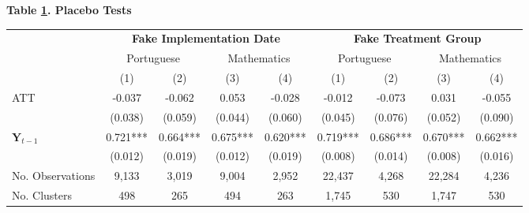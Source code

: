 \documentclass[a4paper, 12pt]{article}
\begin{document}
{
             \begin{table}[h]                                    \label{table:PlaceboTest}                        \centering            \textbf{Table \ref{table:PlaceboTest}. Placebo Tests} \\
\vspace{5pt}                    
\begin{adjustbox}{max width=\textwidth}             
\begin{tabular}{@{\extracolsep{4pt}}l*{8}{c}@{}}             \toprule                    & \multicolumn{4}{c}{\textbf{Fake Implementation Date}} &            \multicolumn{4}{c}{\textbf{Fake Treatment Group}} \\            \cline{2-5}              \cline{6-9}                    & \multicolumn{2}{c}{Portuguese} &                    \multicolumn{2}{c}{Mathematics} &                    \multicolumn{2}{c}{Portuguese} &            \multicolumn{2}{c}{Mathematics} \\            \cline{2-3}                    \cline{4-5}                    \cline{6-7}            \cline{8-9}                    
                    &         (1)   &         (2)   &         (3)   &         (4)   &         (1)   &         (2)   &         (3)   &         (4)   \\
\hline
ATT                 &      -0.037   &      -0.062   &       0.053   &      -0.028   &   -0.012      &   -0.073      &    0.031      &        -0.055 \\
                    &     (0.038)   &     (0.059)   &     (0.044)   &     (0.060)   &   (0.045)     &   (0.076)     &   (0.052)     &       (0.090) \\
$\mathbf{Y}_{t-1}$              &       0.721***&       0.664***&              0.675*** &       0.620***        &  0.719***     &  0.686***     &     0.670***          &    0.662***           \\
                    &     (0.012)   &     (0.019)   &              (0.012) &        (0.019)       &  (0.008)      &   (0.014)     &    (0.008)           &       (0.016)        \\
\hline
No. Observations        &       9,133   &        3,019   &       9,004   &        2,952   &    22,437      &    4,268       &         22,284 &    4,236       \\
No. Clusters          &     498          &    265           &              494 &      263         &    1,745           &       530        &              1,747 &      530         \\

\end{tabular}
\end{adjustbox}
\end{table}}
\end{document}
